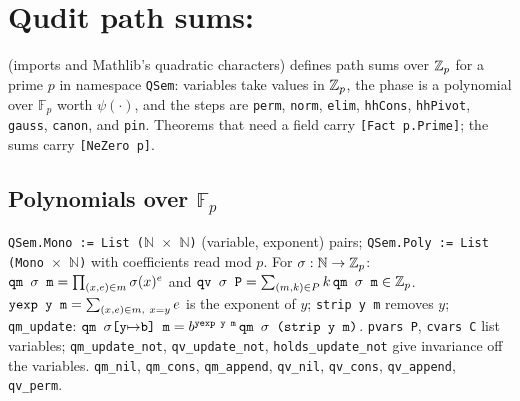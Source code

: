 \section{Qudit path sums: \texorpdfstring{}{PathSumQudit}}\label{sec:lean-pathsum-qudit}

 (imports  and Mathlib's quadratic characters) defines path sums
over $\mathbb{Z}_{p}$ for a prime $p$ in namespace \textnormal{\texttt{QSem}}: variables take values in $\mathbb{Z}_{p}$, the phase is
a polynomial over $\mathbb F_p$ worth $\psi(\cdot)$, and the steps are \textnormal{\texttt{perm}}, \textnormal{\texttt{norm}},
\textnormal{\texttt{elim}}, \textnormal{\texttt{hhCons}}, \textnormal{\texttt{hhPivot}}, \textnormal{\texttt{gauss}}, \textnormal{\texttt{canon}}, and \textnormal{\texttt{pin}}. Theorems that
need a field carry \textnormal{\texttt{[Fact p.\allowbreak{}Prime]}}; the sums carry \textnormal{\texttt{[NeZero p]}}.

\subsection{Polynomials over \texorpdfstring{$\mathbb F_p$}{F\_p}}

\begin{definition}\label{def:lean-pathsum-qpoly}
\textnormal{\texttt{QSem.\allowbreak{}Mono := List (\allowbreak{}\ensuremath{\mathbb{N}} \ensuremath{\times} \ensuremath{\mathbb{N}})}} (variable, exponent) pairs; \textnormal{\texttt{QSem.\allowbreak{}Poly := List (\allowbreak{}Mono \ensuremath{\times} \ensuremath{\mathbb{N}})}}
with coefficients read mod $p$. For $\sigma:\mathbb{N}\to\mathbb{Z}_{p}$:
$\textnormal{\texttt{qm \ensuremath{\sigma} m}} = \prod_{(x,e)\in m}\sigma(x)^e$ and $\textnormal{\texttt{qv \ensuremath{\sigma} P}} = \sum_{(m,k)\in P} k\,\textnormal{\texttt{qm \ensuremath{\sigma} m}}\in\mathbb{Z}_{p}$.
$\textnormal{\texttt{yexp y m}} = \sum_{(x,e)\in m,\ x=y} e$ is the exponent of $y$; \textnormal{\texttt{strip y m}} removes $y$;
\textnormal{\texttt{qm\_\allowbreak{}update}}: $\textnormal{\texttt{qm \ensuremath{\sigma}[y\ensuremath{\mapsto}b] m}} = b^{\textnormal{\texttt{yexp y m}}}\,\textnormal{\texttt{qm \ensuremath{\sigma} (\allowbreak{}strip y m)}}$.
\textnormal{\texttt{pvars P}}, \textnormal{\texttt{cvars C}} list variables; \textnormal{\texttt{qm\_\allowbreak{}update\_\allowbreak{}not}}, \textnormal{\texttt{qv\_\allowbreak{}update\_\allowbreak{}not}},
\textnormal{\texttt{holds\_\allowbreak{}update\_\allowbreak{}not}} give invariance off the variables. \textnormal{\texttt{qm\_\allowbreak{}nil}}, \textnormal{\texttt{qm\_\allowbreak{}cons}},
\textnormal{\texttt{qm\_\allowbreak{}append}}, \textnormal{\texttt{qv\_\allowbreak{}nil}}, \textnormal{\texttt{qv\_\allowbreak{}cons}}, \textnormal{\texttt{qv\_\allowbreak{}append}}, \textnormal{\texttt{qv\_\allowbreak{}perm}}.
\end{definition}

